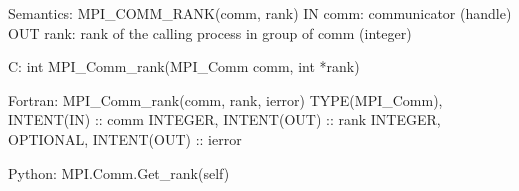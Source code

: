 Semantics:
MPI_COMM_RANK(comm, rank)
IN comm: communicator (handle)
OUT rank: rank of the calling process in group of comm (integer)

C:
int MPI_Comm_rank(MPI_Comm comm, int *rank)

Fortran:
MPI_Comm_rank(comm, rank, ierror)
TYPE(MPI_Comm), INTENT(IN) :: comm
INTEGER, INTENT(OUT) :: rank
INTEGER, OPTIONAL, INTENT(OUT) :: ierror

Python:
MPI.Comm.Get_rank(self)

